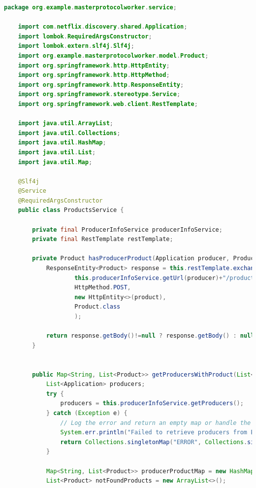 \begin{lstlisting}[language=Java,caption= Kod klasy ProductsService, label=productsServiceCode]
    package org.example.masterprotocolworker.service;

    import com.netflix.discovery.shared.Application;
    import lombok.RequiredArgsConstructor;
    import lombok.extern.slf4j.Slf4j;
    import org.example.masterprotocolworker.model.Product;
    import org.springframework.http.HttpEntity;
    import org.springframework.http.HttpMethod;
    import org.springframework.http.ResponseEntity;
    import org.springframework.stereotype.Service;
    import org.springframework.web.client.RestTemplate;
    
    import java.util.ArrayList;
    import java.util.Collections;
    import java.util.HashMap;
    import java.util.List;
    import java.util.Map;
    
    @Slf4j
    @Service
    @RequiredArgsConstructor
    public class ProductsService {
    
        private final ProducerInfoService producerInfoService;
        private final RestTemplate restTemplate;
    
        private Product hasProducerProduct(Application producer, Product product){
            ResponseEntity<Product> response = this.restTemplate.exchange(
                    this.producerInfoService.getUrl(producer)+"/products/check",
                    HttpMethod.POST,
                    new HttpEntity<>(product),
                    Product.class
                    );
    
            return response.getBody()!=null ? response.getBody() : null;
        }
    
    
        public Map<String, List<Product>> getProducersWithProduct(List<Product> productList) {
            List<Application> producers;
            try {
                producers = this.producerInfoService.getProducers();
            } catch (Exception e) {
                // Log the error and return an empty map or handle the error as needed
                System.err.println("Failed to retrieve producers from Eureka: " + e.getMessage());
                return Collections.singletonMap("ERROR", Collections.singletonList(new Product()));
            }
    
            Map<String, List<Product>> producerProductMap = new HashMap<>();
            List<Product> notFoundProducts = new ArrayList<>();
    

\end{lstlisting}
